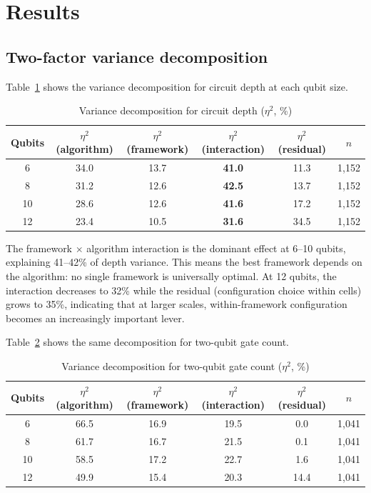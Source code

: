 \documentclass[11pt,a4paper]{article}
\begin{document}

\section{Results}

\subsection{Two-factor variance decomposition}

Table~\ref{tab:variance_depth} shows the variance decomposition for circuit depth at each qubit size.

\begin{table}[H]
\centering
\caption{Variance decomposition for circuit depth ($\eta^2$, \%)}
\label{tab:variance_depth}
\begin{tabular}{cccccc}
\toprule
Qubits & $\eta^2$(algorithm) & $\eta^2$(framework) & $\eta^2$(interaction) & $\eta^2$(residual) & $n$ \\
\midrule
6  & 34.0 & 13.7 & \textbf{41.0} & 11.3 & 1{,}152 \\
8  & 31.2 & 12.6 & \textbf{42.5} & 13.7 & 1{,}152 \\
10 & 28.6 & 12.6 & \textbf{41.6} & 17.2 & 1{,}152 \\
12 & 23.4 & 10.5 & \textbf{31.6} & 34.5 & 1{,}152 \\
\bottomrule
\end{tabular}
\end{table}

The framework $\times$ algorithm interaction is the dominant effect at 6--10 qubits, explaining 41--42\% of depth variance. This means the best framework depends on the algorithm: no single framework is universally optimal. At 12 qubits, the interaction decreases to 32\% while the residual (configuration choice within cells) grows to 35\%, indicating that at larger scales, within-framework configuration becomes an increasingly important lever.

Table~\ref{tab:variance_tqg} shows the same decomposition for two-qubit gate count.

\begin{table}[H]
\centering
\caption{Variance decomposition for two-qubit gate count ($\eta^2$, \%)}
\label{tab:variance_tqg}
\begin{tabular}{cccccc}
\toprule
Qubits & $\eta^2$(algorithm) & $\eta^2$(framework) & $\eta^2$(interaction) & $\eta^2$(residual) & $n$ \\
\midrule
6  & 66.5 & 16.9 & 19.5 & 0.0 & 1{,}041 \\
8  & 61.7 & 16.7 & 21.5 & 0.1 & 1{,}041 \\
10 & 58.5 & 17.2 & 22.7 & 1.6 & 1{,}041 \\
12 & 49.9 & 15.4 & 20.3 & 14.4 & 1{,}041 \\
\bottomrule
\end{tabular}
\end{table}
\end{document}
